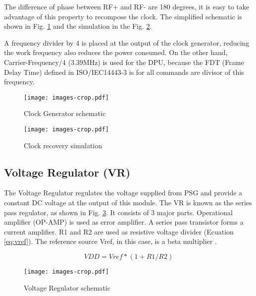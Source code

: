 The difference of phase between RF+ and RF- are 180 degrees, it is easy to take advantage of this property to recompose the clock. The simplified schematic is shown in Fig. \ref{fig:clk} and the simulation in the Fig. \ref{fig:clk_sim}.

A frequency divider by 4 is placed at the output of the clock generator, reducing the work frequency also reduces the power consumed. On the other hand, Carrier-Frequency/4 (3.39MHz) is used for the DPU, because the FDT (Frame Delay Time)  defined in ISO/IEC14443-3 is for all commands are divisor of this frequency.
 

\begin{figure}[]
  \centering
  \texttt{[image: images-crop.pdf]}
  \caption{Clock Generator schematic}
  \label{fig:clk}
\end{figure}

\begin{figure}[]
  \centering
  \texttt{[image: images-crop.pdf]}
  \caption{Clock recovery simulation}
  \label{fig:clk_sim}
\end{figure}

\subsection{Voltage Regulator (VR)}

The Voltage Regulator \cite{rfid_ldo} regulates the voltage supplied from PSG and provide a constant DC voltage at the output of this module. The VR is known as the series pass regulator, as shown in Fig. \ref{fig:ldo}. It consists of 3 major parts. Operational amplifier (OP-AMP) is used as error amplifier. A series pass transistor forms a current amplifier. R1 and R2 are used as resistive voltage divider (Ecuation \ref{eq:vref}). The reference source Vref, in this case, is a beta multiplier \cite{panadero}. 

\begin{equation} \label{eq:vref}
VDD = Vref*(1+R1/R2)
\end{equation}


\begin{figure}[]
  \centering
  \texttt{[image: images-crop.pdf]}
  \caption{Voltage Regulator schematic}
  \label{fig:ldo}
\end{figure}

